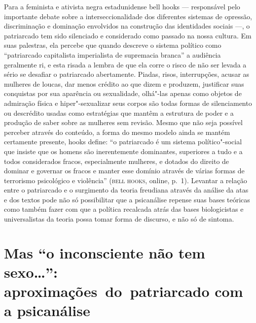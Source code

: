Para a feminista e ativista negra estadunidense bell hooks --- responsável
pelo importante debate sobre a interseccionalidade dos diferentes
sistemas de opressão, discriminação e dominação envolvidos na construção
das identidades sociais ---, o patriarcado tem sido silenciado e
considerado como passado na nossa cultura. Em suas palestras, ela
percebe que quando descreve o sistema político como ``patriarcado
capitalista imperialista de supremacia branca'' a audiência geralmente
ri, e esta risada a lembra de que ela corre o risco de não ser levada a
sério se desafiar o patriarcado abertamente. Piadas, risos,
interrupções, acusar as mulheres de loucas, dar menos crédito ao que
dizem e produzem, justificar suas conquistas por sua aparência ou
sexualidade, olhá"-las apenas como objetos de admiração física e
hiper"-sexualizar seus corpos são todas formas de silenciamento ou
descrédito usadas como estratégias que mantêm a estrutura de poder e a
produção de saber sobre as mulheres sem revisão. Mesmo que não seja
possível perceber através do conteúdo, a forma do mesmo modelo ainda se
mantém certamente presente, hooks define: ``o patriarcado é um sistema
político"-social que insiste que os homens são inerentemente dominantes,
superiores a tudo e a todos considerados fracos, especialmente mulheres,
e dotados do direito de dominar e governar os fracos e manter esse
domínio através de várias formas de terrorismo psicológico e violência''
(\textsc{bell hooks}, online, p.~1). Levantar a relação entre o patriarcado e o
surgimento da teoria freudiana através da análise da atas e dos textos
pode não só possibilitar que a psicanálise repense suas bases teóricas
como também fazer com que a política recalcada atrás das bases
biologicistas e universalistas da teoria possa tomar forma de discurso,
e não só de sintoma.

\section{Mas ``o inconsciente não tem sexo\ldots{}'': aproximações~do~patriarcado com a psicanálise }

